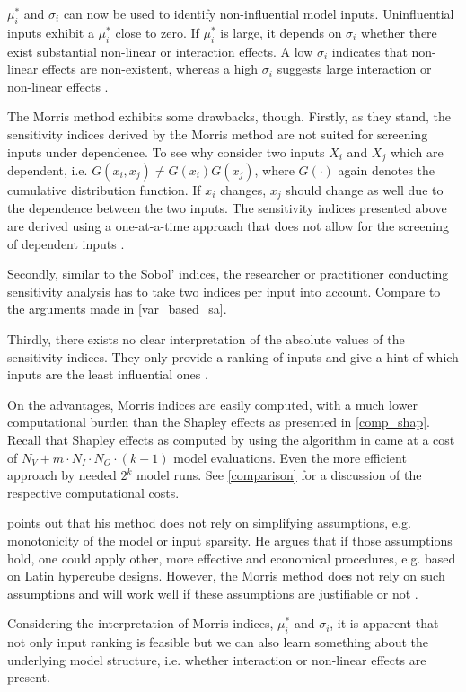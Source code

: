 $\mu_i^\ast$ and $\sigma_i$ can now be used to identify non-influential model inputs. Uninfluential inputs exhibit a $\mu_i^\ast$ close to zero. If $\mu_i^\ast$ is large, it depends on $\sigma_i$ whether there exist substantial non-linear or interaction effects. A low $\sigma_i$ indicates that non-linear effects are non-existent, whereas a high $\sigma_i$ suggests large interaction or non-linear effects \citep{GM17}.

The Morris method exhibits some drawbacks, though. Firstly, as they stand, the sensitivity indices derived by the Morris method are not suited for screening inputs under dependence. To see why consider two inputs $X_i$ and $X_j$ which are dependent, i.e. $G(x_i, x_j) \neq G(x_i)G(x_j)$, where $G(\cdot)$ again denotes the cumulative distribution function. If $x_i$ changes, $x_j$ should change as well due to the dependence between the two inputs. The sensitivity indices presented above are derived using a one-at-a-time approach that does not allow for the screening of dependent inputs \citep{GM17}.

Secondly, similar to the Sobol' indices, the researcher or practitioner conducting sensitivity analysis has to take two indices per input into account. Compare to the arguments made in \cref{var_based_sa}.

Thirdly, there exists no clear interpretation of the absolute values of the sensitivity indices. They only provide a ranking of inputs and give a hint of which inputs are the least influential ones \citep{GM17}.

On the advantages, Morris indices are easily computed, with a much lower computational burden than the Shapley effects as presented in \cref{comp_shap}. Recall that Shapley effects as computed by using the algorithm in \citet{SNS16} came at a cost of $N_V+m \cdot N_I \cdot N_O \cdot (k-1)$ model evaluations. Even the more efficient approach by \citet{PRB20} needed $2^k$ model runs. See \cref{comparison} for a discussion of the respective computational costs.

\citet{M91} points out that his method does not rely on simplifying assumptions, e.g. monotonicity of the model or input sparsity. He argues that if those assumptions hold, one could apply other, more effective and economical procedures, e.g. based on Latin hypercube designs. However, the Morris method does not rely on such assumptions and will work well if these assumptions are justifiable or not \citep{M91}.

Considering the interpretation of Morris indices, $\mu_i^\ast$ and $\sigma_i$, it is apparent that not only input ranking is feasible but we can also learn something about the underlying model structure, i.e. whether interaction or non-linear effects are present.


